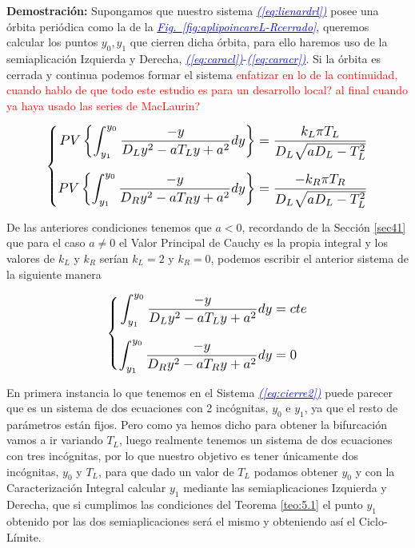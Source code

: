 \documentclass[12pt,a4paper]{report} %
\newcommand{\fref}[1]{\hyperref[#1]{\textcolor{blue}{\textit{Fig.~\ref*{#1}}}}}
\newcommand{\eref}[1]{\hyperref[#1]{\textcolor{blue}{\textit{(\ref*{#1})}}}}
\begin{document}
	\vspace{0.5cm}\noindent \textbf{Demostración:} Supongamos que nuestro sistema \eref{eq:lienardrl} posee una órbita periódica como la de la \fref{fig:aplipoincareL-Rcerrado}, queremos calcular los puntos $y_0, y_1$ que cierren dicha órbita, para ello haremos uso de la semiaplicación Izquierda y Derecha, \eref{eq:caracl}-\eref{eq:caracr}. Si la órbita es cerrada  y continua podemos formar el sistema \textcolor{red}{enfatizar en lo de la continuidad, cuando hablo de que todo este estudio es para un desarrollo local? al final cuando ya haya usado las series de MacLaurin?}
	
	\begin{equation}
		\label{eq:cierre}
		\scalebox{1.2}{$\displaystyle
			\left\{
			\begin{aligned}
				PV\left\{\int_{y_1}^{y_0}\frac{-y}{D_Ly^2-aT_Ly+a^2}dy\right\}&=\frac{k_L\pi T_L}{D_L\sqrt{aD_L-T_L^2}}
				\\[2mm]
				PV\left\{\int_{y_1}^{y_0}\frac{-y}{D_Ry^2-aT_Ry+a^2}dy\right\}&=\frac{-k_R\pi T_R}{D_L\sqrt{aD_L-T_L^2}}
			\end{aligned}
			\right. 
			$}
	\end{equation}\smallskip
	
	De las anteriores condiciones tenemos que $a<0$, recordando de la Sección \ref{sec41} que para el caso $a\neq0$ el Valor Principal de Cauchy es la propia integral y los valores de $k_L$ y $k_R$ serían $k_L=2$ y $k_R=0$, podemos escribir el anterior sistema de la siguiente manera
	
	\begin{equation}
		\label{eq:cierre2}
		\scalebox{1.2}{$\displaystyle
			\left\{
			\begin{aligned}
				\int_{y_1}^{y_0}\frac{-y}{D_Ly^2-aT_Ly+a^2}dy&=cte
				\\[2mm]
				\int_{y_1}^{y_0}\frac{-y}{D_Ry^2-aT_Ry+a^2}dy&=0
			\end{aligned}
			\right. 
			$}
	\end{equation}\smallskip
	
	\vspace{0.5cm}\noindent En primera instancia lo que tenemos en el Sistema \eref{eq:cierre2} puede parecer que es un sistema de dos ecuaciones con 2 incógnitas, $y_0$ e $y_1$, ya que el resto de parámetros están fijos. Pero como ya hemos dicho para obtener la bifurcación vamos a ir variando $T_L$, luego realmente tenemos un sistema de dos ecuaciones con tres incógnitas, por lo que nuestro objetivo es tener únicamente dos incógnitas, $y_0$ y $T_L$, para que dado un valor de $T_L$ podamos obtener $y_0$ y con la Caracterización Integral calcular $y_1$ mediante las semiaplicaciones Izquierda y Derecha, que si cumplimos las condiciones del Teorema \ref{teo:5.1} el punto $y_1$ obtenido por las dos semiaplicaciones será el mismo y obteniendo así el Ciclo-Límite.
	
\end{document}
